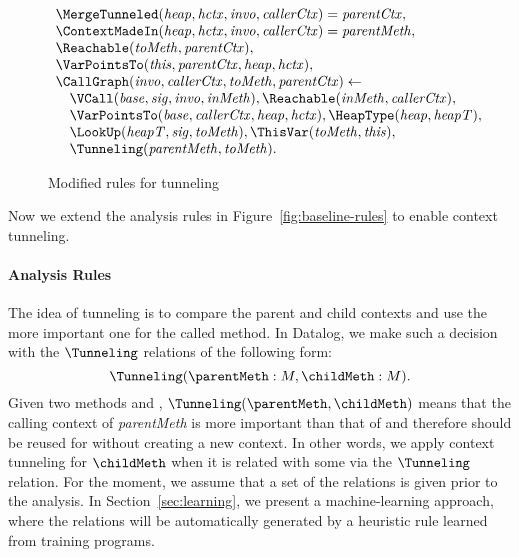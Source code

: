 {\begin{figure}[t]
\[\begin{array}{l}
  \MergeTunneled ({\it heap}, {\it hctx}, {\it invo}, {\it callerCtx}) = {\it parentCtx}, \\
  \ContextMadeIn ({\it heap}, {\it hctx}, {\it invo}, {\it callerCtx}) = {\it parentMeth}, \\
  \Reachable ({\it toMeth}, {\it parentCtx}), \\
  \VarPointsTo ({\it this}, {\it parentCtx}, {\it heap}, {\it hctx}), \\
  \CallGraph ({\it invo}, {\it callerCtx}, {\it toMeth}, {\it parentCtx})
  \leftarrow \\
    \quad \VCall ({\it base}, {\it sig}, {\it invo}, {\it inMeth}), 
     \Reachable ({\it inMeth}, {\it callerCtx}), \\
   \quad \VarPointsTo ({\it base}, {\it callerCtx}, {\it heap}, {\it hctx}), 
  \HeapType({\it heap}, {\it heapT}), \\
  \quad \LookUp ({\it heapT}, {\it sig}, {\it toMeth}),
  \ThisVar ({\it toMeth}, {\it this}),  \\
\quad  \Tunneling({\it parentMeth}, {\it toMeth}).
\end{array}
\]
\caption{Modified rules for tunneling}
\label{fig:tunneling-rules}
\end{figure}




Now we extend the analysis rules in Figure~\ref{fig:baseline-rules} to
enable context tunneling. 

\paragraph{Analysis Rules}
The idea of tunneling is to compare the parent and child contexts and
use the more important one for the called method.  In Datalog, we make
such a decision with the $\Tunneling$ relations of the following form:
\[
\Tunneling({\parentMeth}: M, {\childMeth}: M).
\]
Given two methods {\parentMeth} and {\childMeth},
$\Tunneling ({\parentMeth}, {\childMeth})$ means that the calling
context of {\it parentMeth} is more important than that of
{\childMeth} and therefore should be reused for {\childMeth} without
creating a new context. In other words, we apply context tunneling for
$\childMeth$ when it is related with some {\parentMeth} via the
$\Tunneling$ relation.  For the moment, we assume that a set of the relations is given
prior to the analysis.  In Section~\ref{sec:learning}, we present a
machine-learning approach, where the relations will be automatically generated by a
heuristic rule learned from training programs.


}
